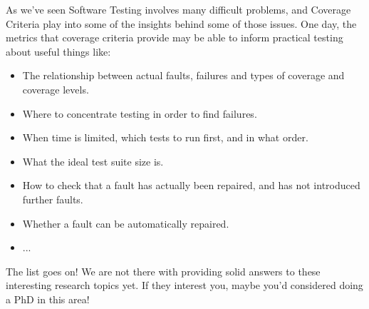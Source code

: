 As we've seen Software Testing involves many difficult problems, and Coverage
Criteria play into some of the insights behind some of those issues. One day,
the metrics that coverage criteria provide may be able to inform practical
testing about useful things like:

\begin{itemize}

    \item The relationship between actual faults, failures and types of coverage
    and coverage levels.

    \item Where to concentrate testing in order to find failures.

    \item When time is limited, which tests to run first, and in what order.

    \item What the ideal test suite size is.
    
    \item How to check that a fault has actually been repaired, and has not
    introduced further faults. 
    
    \item Whether a fault can be automatically repaired.

    \item ... 

\end{itemize}    

The list goes on! We are not there with providing solid answers to these
interesting research topics yet. If they interest you, maybe you'd considered
doing a PhD in this area!


